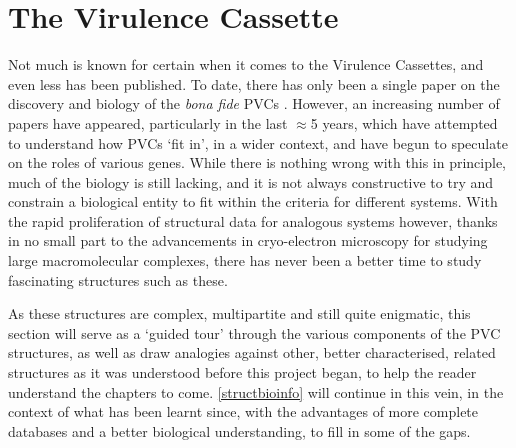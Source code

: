 \section{The \Pa{} Virulence Cassette}
Not much is known for certain when it comes to the \Pa{} Virulence Cassettes, and even less has been published. To date, there has only been a single paper on the discovery and biology of the \emph{bona fide} PVCs \citep{Yang2006}. However, an increasing number of papers have appeared, particularly in the last $\approx$5 years, which have attempted to understand how PVCs `fit in', in a wider context, and have begun to speculate on the roles of various genes. While there is nothing wrong with this in principle, much of the biology is still lacking, and it is not always constructive to try and constrain a biological entity to fit within the criteria for different systems. With the rapid proliferation of structural data for analogous systems however, thanks in no small part to the advancements in cryo-electron microscopy for studying large macromolecular complexes, there has never been a better time to study fascinating structures such as these.

As these structures are complex, multipartite and still quite enigmatic, this section will serve as a `guided tour' through the various components of the PVC structures, as well as draw analogies against other, better characterised, related structures as it was understood before this project began, to help the reader understand the chapters to come. \vref{structbioinfo} will continue in this vein, in the context of what has been learnt since, with the advantages of more complete databases and a better biological understanding, to fill in some of the gaps.


